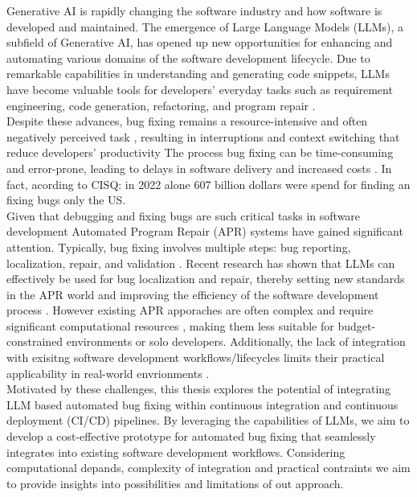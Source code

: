 Generative AI is rapidly changing the software industry and how software is developed and maintained. The emergence of Large Language Models (LLMs), a subfield of Generative AI, has opened up new opportunities for enhancing and automating various domains of the software development lifecycle. Due to remarkable capabilities in understanding and generating code snippets, LLMs have become valuable tools for developers' everyday tasks such as requirement engineering, code generation, refactoring, and program repair \cite{houLargeLanguageModels2024, puvvadiCodingAgentsComprehensive2025}.
\\
Despite these advances, bug fixing remains a resource-intensive and often negatively perceived task \cite{winterHowDevelopersReally2023}, resulting in  interruptions and context switching that reduce developers' productivity \cite{vasilescuSkyNotLimit2016}
The process bug fixing can be time-consuming and error-prone, leading to delays in software delivery and increased costs \cite{}. In fact, acording to  CISQ: in 2022 alone 607 billion dollars were spend for finding an fixing bugs only the US\cite{CostPoorSoftware}.
\\
Given that debugging and fixing bugs are such critical tasks in software development Automated Program Repair (APR) systems have gained significant attention.
Typically, bug fixing involves multiple steps: bug reporting, localization, repair, and validation \cite{zhangEmpiricalStudyFactors2012, leeUnifiedDebuggingApproach2024,xiaAgentlessDemystifyingLLMbased2024,zhangPATCHEmpoweringLarge2025, wangEmpiricalResearchUtilizing2025}.
Recent research has shown that LLMs can effectively be used for bug localization and repair, thereby setting new standards in the APR world and improving the efficiency of the software development process \cite{xiaAgentlessDemystifyingLLMbased2024,liuMarsCodeAgentAInative2024,yangSWEagentAgentComputerInterfaces2024, sobaniaAnalysisAutomaticBug2023, xiaAutomatedProgramRepair2024, huCanGPTO1Kill2024}.
However existing APR apporaches are often complex and require significant computational resources \cite{rondonEvaluatingAgentbasedProgram2025, }, making them less suitable for budget-constrained environments or solo developers. Additionally, the lack of integration with exisitng software development workflows/lifecycles limits their practical applicability in real-world envrionments \cite{chenUnveilingPitfallsUnderstanding2025,liuMarsCodeAgentAInative2024}.
\\
Motivated by these challenges, this thesis explores the potential of integrating LLM based automated bug fixing within continuous integration and continuous deployment (CI/CD) pipelines. By leveraging the capabilities of LLMs, we aim to develop a cost-effective prototype for automated bug fixing that seamlessly integrates into existing software development workflows. Considering computational depands, complexity of integration and practical contraints we aim to provide insights into possibilities and limitations of out approach.





